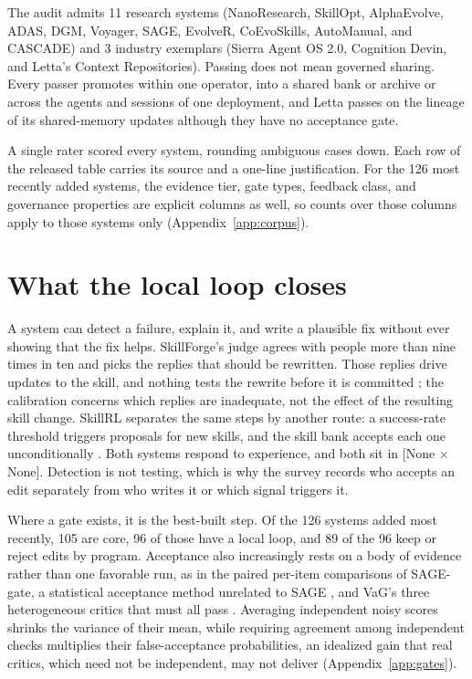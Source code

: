 The audit admits 11 research systems (NanoResearch, SkillOpt, AlphaEvolve, ADAS, DGM, Voyager, SAGE, EvolveR, CoEvoSkills, AutoManual, and CASCADE) and 3 industry exemplars (Sierra Agent OS 2.0, Cognition Devin, and Letta's Context Repositories). Passing does not mean governed sharing. Every passer promotes within one operator, into a shared bank or archive or across the agents and sessions of one deployment, and Letta passes on the lineage of its shared-memory updates although they have no acceptance gate.

A single rater scored every system, rounding ambiguous cases down. Each row of the released table carries its source and a one-line justification. For the 126 most recently added systems, the evidence tier, gate types, feedback class, and governance properties are explicit columns as well, so counts over those columns apply to those systems only (Appendix~\ref{app:corpus}).

\section{What the local loop closes}\label{sec:local}

A system can detect a failure, explain it, and write a plausible fix without ever showing that the fix helps. SkillForge's judge agrees with people more than nine times in ten and picks the replies that should be rewritten. Those replies drive updates to the skill, and nothing tests the rewrite before it is committed \citep{skillforge2026}; the calibration concerns which replies are inadequate, not the effect of the resulting skill change. SkillRL separates the same steps by another route: a success-rate threshold triggers proposals for new skills, and the skill bank accepts each one unconditionally \citep{skillrl2026}. Both systems respond to experience, and both sit in {[}None \(\times\) None{]}. Detection is not testing, which is why the survey records who accepts an edit separately from who writes it or which signal triggers it.

Where a gate exists, it is the best-built step. Of the 126 systems added most recently, 105 are core, 96 of those have a local loop, and 89 of the 96 keep or reject edits by program. Acceptance also increasingly rests on a body of evidence rather than one favorable run, as in the paired per-item comparisons of SAGE-gate, a statistical acceptance method unrelated to SAGE \citep{wang2026sagegate}, and VaG's three heterogeneous critics that must all pass \citep{shang2026vag}. Averaging independent noisy scores shrinks the variance of their mean, while requiring agreement among independent checks multiplies their false-acceptance probabilities, an idealized gain that real critics, which need not be independent, may not deliver (Appendix~\ref{app:gates}).

